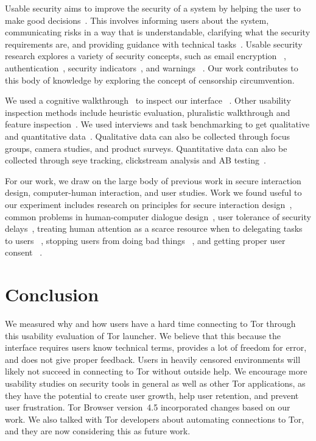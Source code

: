 \documentclass[USenglish,oneside,twocolumn]{article}
\begin{document}
Usable security aims to improve the security of a system by helping the user to make good decisions~\cite{payne2008brief}. This involves informing users about the system, communicating risks in a way that is understandable, clarifying what the security requirements are, and providing guidance with technical tasks~\cite{adams1999users}. Usable security research explores a variety of security concepts, such as email encryption ~\cite{whitten1999johnny}\cite{garfinkel2005johnny}, authentication~\cite{morris1979password}\cite{dhamija2000deja}\cite{suo2005graphical}, security indicators~\cite{dhamija2006phishing}\cite{akhawe2013alice}, and warnings ~\cite{schechter2007emperor}\cite{egelman2008you}. Our work contributes to this body of knowledge by exploring the concept of censorship circumvention.

We used a cognitive walkthrough~\cite{wharton1994cognitive}\cite{cognitive-walkthrough} to inspect our interface~\cite{nielsen1994usability} . Other usability inspection methods include heuristic evaluation, pluralistic walkthrough and feature inspection~\cite{inspection}. We used interviews and task benchmarking to get qualitative and quantitative data~\cite{krol2016towards}. Qualitative data can also be collected through focus groups, camera studies, and product surveys. Quantitative data can also be collected through seye tracking, clickstream analysis and AB testing~\cite{ux-methods}. 
 
For our work, we draw on the large body of previous work in secure interaction design, computer-human interaction, and user studies. Work we found useful to our experiment includes research on principles for secure interaction design~\cite{yee2002user}, common problems in human-computer dialogue design~\cite{molich1990improving}, user tolerance of security delays~\cite{egelmanplease}, treating human attention as a scarce resource when to delegating tasks to users ~\cite{bohme2011security}, stopping users from doing bad things ~\cite{good2007noticing}, and getting proper user consent ~\cite{bohme2010trained}. 

\section{Conclusion} 
\label{sec:conclusion}
We measured why and how users have a hard time connecting to Tor through this usability evaluation of Tor launcher. We believe that this because the interface requires users know technical terms, provides a lot of freedom for error, and does not give proper feedback. Users in heavily censored environments will likely not succeed in connecting to Tor without outside help. We encourage more usability studies on security tools in general as well as other Tor applications, as they have the potential to create user growth, help user retention, and prevent user frustration. Tor Browser version~4.5 incorporated  changes based on our work. We also talked with Tor developers about automating connections to Tor, and they are now considering this as future work. 
\end{document}

